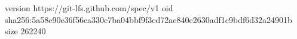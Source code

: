 version https://git-lfs.github.com/spec/v1
oid sha256:5a58e90e36f56ea330c7ba04bbf9f3ed72ae840e2630adf1c9bdf6d32a24901b
size 262240
